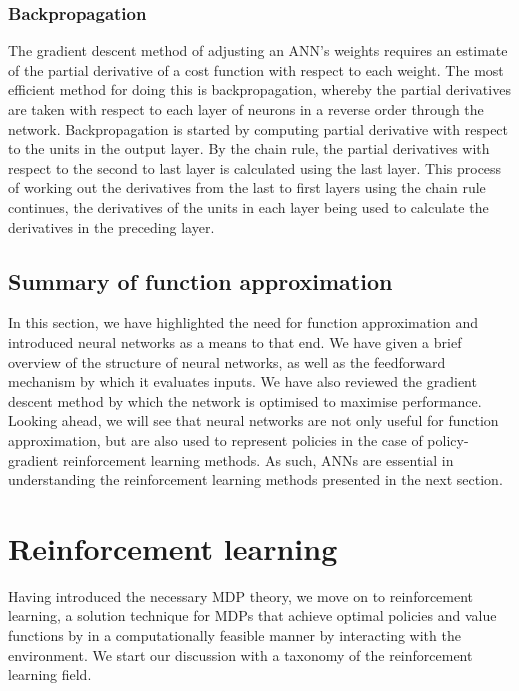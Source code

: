\subsubsection{Backpropagation}
The gradient descent method of adjusting an ANN's weights requires an estimate of the partial derivative of a cost function with respect to each weight.
The most efficient method for doing this is backpropagation, whereby the partial derivatives are taken with respect to each layer of neurons in a reverse order through the network.
Backpropagation is started by computing partial derivative with respect to the units in the output layer.
By the chain rule, the partial derivatives with respect to the second to last layer is calculated using the last layer.
This process of working out the derivatives from the last to first layers using the chain rule continues, the derivatives of the units in each layer being used to calculate the derivatives in the preceding layer.

\subsection{Summary of function approximation}
In this section, we have highlighted the need for function approximation and introduced neural networks as a means to that end.
We have given a brief overview of the structure of neural networks, as well as the feedforward mechanism by which it evaluates inputs. We have also reviewed the gradient descent method by which the network is optimised to maximise performance.
Looking ahead, we will see that neural networks are not only useful for function approximation, but are also used to represent policies in the case of policy-gradient reinforcement learning methods.
As such, ANNs are essential in understanding the reinforcement learning methods presented in the next section.

\section{Reinforcement learning}
Having introduced the necessary MDP theory, we move on to reinforcement learning, a solution technique for MDPs that achieve optimal policies and value functions by in a computationally feasible manner by interacting with the environment.
We start our discussion with a taxonomy of the reinforcement learning field.

